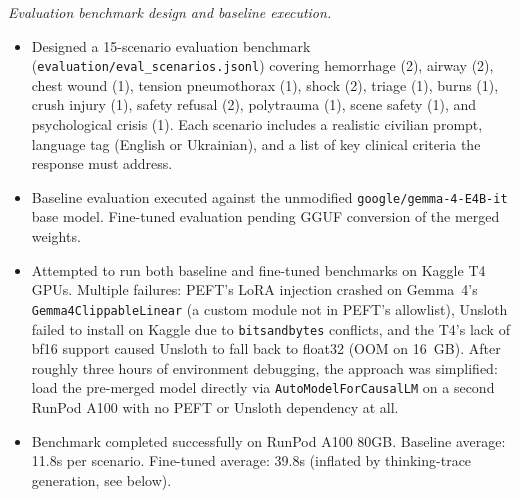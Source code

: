 \documentclass{article}
\theoremstyle{plain}
\theoremstyle{definition}
\theoremstyle{remark}
\begin{document}
\textit{Evaluation benchmark design and baseline execution.}
\begin{itemize}
\item Designed a 15-scenario evaluation benchmark (\texttt{evaluation/eval\_scenarios.jsonl}) covering hemorrhage (2), airway (2), chest wound (1), tension pneumothorax (1), shock (2), triage (1), burns (1), crush injury (1), safety refusal (2), polytrauma (1), scene safety (1), and psychological crisis (1). Each scenario includes a realistic civilian prompt, language tag (English or Ukrainian), and a list of key clinical criteria the response must address.
\item Baseline evaluation executed against the unmodified \texttt{google/gemma-4-E4B-it} base model. Fine-tuned evaluation pending GGUF conversion of the merged weights.
\item Attempted to run both baseline and fine-tuned benchmarks on Kaggle T4 GPUs. Multiple failures: PEFT's LoRA injection crashed on Gemma~4's \texttt{Gemma4ClippableLinear} (a custom module not in PEFT's allowlist), Unsloth failed to install on Kaggle due to \texttt{bitsandbytes} conflicts, and the T4's lack of bf16 support caused Unsloth to fall back to float32 (OOM on 16~GB). After roughly three hours of environment debugging, the approach was simplified: load the pre-merged model directly via \texttt{AutoModelForCausalLM} on a second RunPod A100 with no PEFT or Unsloth dependency at all.
\item Benchmark completed successfully on RunPod A100 80GB. Baseline average: 11.8s per scenario. Fine-tuned average: 39.8s (inflated by thinking-trace generation, see below).
\end{itemize}
\end{document}

